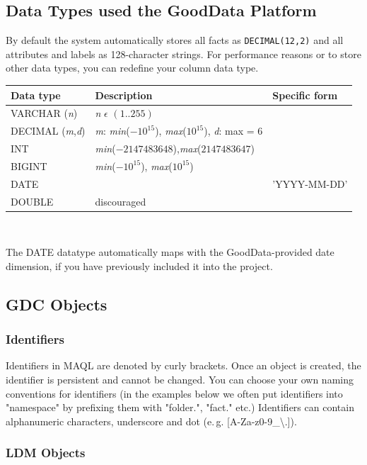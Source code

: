 \documentclass[a4paper, 12pt, titlepage, fleqn]{article}
\begin{document}
\subsection{Data Types used the GoodData Platform}
\label{datatypes}
By default the system automatically stores all facts as \verb=DECIMAL(12,2)= and all attributes and labels as 128-character strings. For performance reasons or to store other data types, you can redefine your column data type.\\

\begin{center}
\begin{tabular}{|l|l|l|} 
\hline
Data type & Description & Specific form \\ \hline
VARCHAR (\emph{n}) & \emph{n} $\epsilon$ $(1..255)$ & \\ 
DECIMAL (\emph{m},\emph{d}) & \emph{m}: \emph{min}($-10^{15}$), \emph{max}($10^{15}$), \emph{d}: max = 6 & \\
INT & \emph{min}($-2147483648$),\emph{max}($2147483647$) & \\
BIGINT & \emph{min}($-10^{15}$), \emph{max}($10^{15}$) & \\
DATE &  & 'YYYY-MM-DD'	 \\
DOUBLE & discouraged & \\ \hline
\end{tabular}\\

\end{center}

The DATE datatype automatically maps with the GoodData-provided date dimension, if you have previously included it into the project.

\subsection{GDC Objects}
\subsubsection{Identifiers}
Identifiers in MAQL are denoted by {curly brackets}. Once an object is created, the identifier is persistent and cannot be changed. You can choose your own naming conventions for identifiers (in the examples below we often put identifiers into "namespace" by prefixing them with "folder.", "fact." etc.) Identifiers can contain alphanumeric characters, underscore and dot (e.\,g. [A-Za-z0-9\_\textbackslash .]).

\subsubsection{LDM Objects}
\end{document}
